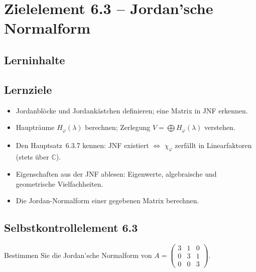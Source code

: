 \documentclass[a4paper,12pt]{article}
\begin{document}
\newpage

\section*{Zielelement 6.3 -- Jordan'sche Normalform}

\subsection*{Lerninhalte}
\begin{center}
\end{center}

\subsection*{Lernziele}
\begin{itemize}
  \item Jordanblöcke und Jordankästchen definieren; eine Matrix in JNF erkennen.
  \item Haupträume $H_\varphi(\lambda)$ berechnen; Zerlegung $V = \bigoplus H_\varphi(\lambda)$ verstehen.
  \item Den Hauptsatz~6.3.7 kennen: JNF existiert $\iff$ $\chi_\varphi$ zerfällt in Linearfaktoren (stets über $\mathbb{C}$).
  \item Eigenschaften aus der JNF ablesen: Eigenwerte, algebraische und geometrische Vielfachheiten.
  \item Die Jordan-Normalform einer gegebenen Matrix berechnen.
\end{itemize}

\subsection*{Selbstkontrollelement 6.3}
Bestimmen Sie die Jordan'sche Normalform von $A = \begin{pmatrix}3&1&0\\0&3&1\\0&0&3\end{pmatrix}$.
\end{document}
